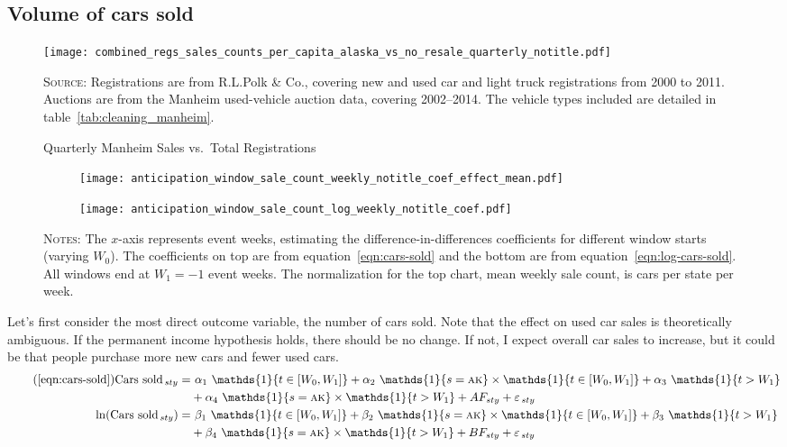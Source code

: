 \documentclass[11pt,letterpaper,oneside]{article}
\let\originalleft\left
\let\originalright\right
\renewcommand{\left}{\mathopen{}\mathclose\bgroup\originalleft}
\renewcommand{\right}{\aftergroup\egroup\originalright}
\newcommand{\snippet}[1]{\hspace{-0.15em}}
\newcommand{\indicator}[1]{\mathds{1}\left\{#1\right\}}
\newcommand{\anticipation}{\indicator{t \in [W_0, W_1]}}
\newcommand{\isAlaska}{\indicator{s = \textsc{ak}}}
\newcommand{\postWindow}{\indicator{t > W_1}}
\newcommand{\ddEqn}[3]{%
\text{#1}_{\, sty} = & \  #2_1 \ \anticipation + #2_2 \ \isAlaska \times \anticipation + #2_3 \ \postWindow \\ \nonumber
&+ #2_4 \ \isAlaska \times \postWindow + #3 F_{ sty} + \varepsilon_{\, sty}
}
\newcommand{\ddEqnLog}[3]{%
\ln\left(\text{#1}_{\, sty}\right) = & \  #2_1 \ \anticipation + #2_2 \ \isAlaska \times \anticipation + #2_3 \ \postWindow \\ \nonumber
&+ #2_4 \ \isAlaska \times \postWindow + #3 F_{ sty} + \varepsilon_{\, sty}
}
\begin{document}
\begin{doublespacing}
\subsection{Volume of cars sold}


\begin{figure}
    \caption{Quarterly Manheim Sales vs.\ Total Registrations}
    \label{fig:comparison_regs_auctions_sales}
    \texttt{[image: combined\_regs\_sales\_counts\_per\_capita\_alaska\_vs\_no\_resale\_quarterly\_notitle.pdf]}

    {\footnotesize
    \textsc{Source:} Registrations are from R.L.Polk \& Co., covering new and used car and light truck registrations from 2000 to 2011.
    Auctions are from the Manheim used-vehicle auction data, covering 2002--2014.
    The vehicle types included are detailed in table~\ref{tab:cleaning_manheim}.

    }
\end{figure}
\begin{figure}[!hbt]
    \caption{$\alpha_2$ and $\beta_2$, the treatment coefficients on Alaska $\times$ anticipation, for varying windows}
    \label{fig:anticipation_window_sale_count}
    \begin{subfigure}{\linewidth}
    \texttt{[image: anticipation\_window\_sale\_count\_weekly\_notitle\_coef\_effect\_mean.pdf]}
    \end{subfigure}
    \begin{subfigure}{\linewidth}
    \texttt{[image: anticipation\_window\_sale\_count\_log\_weekly\_notitle\_coef.pdf]}
    \end{subfigure}

    {\footnotesize
    \textsc{Notes:}
    The $x$-axis represents event weeks, estimating the difference\hyp{}in\hyp{}differences coefficients for different window starts (varying $W_0$).
    The coefficients on top are from equation~\ref{eqn:cars-sold} and the bottom are from equation~\ref{eqn:log-cars-sold}.
    All windows end at $W_1 = -1$ event weeks.
    The normalization for the top chart, mean weekly sale count, is \snippet{sales_count_weekly_mean.tex} cars per state per week.
    }
\end{figure}


Let's first consider the most direct outcome variable, the number of cars sold.
Note that the effect on used car sales is theoretically ambiguous.
If the permanent income hypothesis holds, there should be no change.
If not, I expect overall car sales to increase, but it could be that people purchase more new cars and fewer used cars.
\begin{align}
    \tag{\ref{eqn:cars-sold}}
    \ddEqn{Cars sold}{\alpha}{A}\\
    \label{eqn:log-cars-sold}
    \ddEqnLog{Cars sold}{\beta}{B}
\end{align}


\end{doublespacing}
\end{document}
